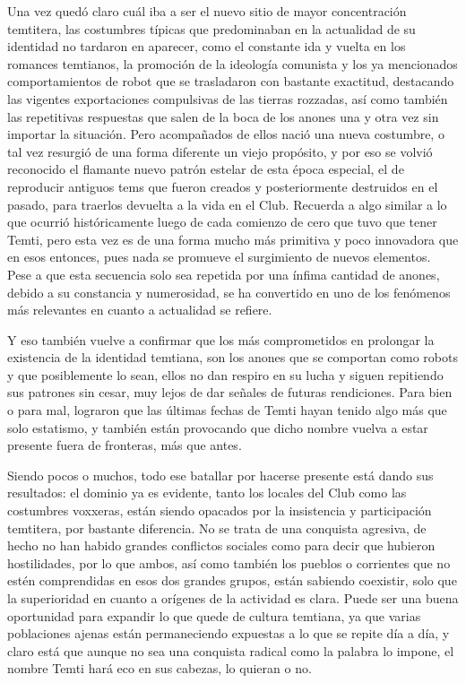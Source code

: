 \documentclass[
  spanish,
]{book}
\begin{document}
Una vez quedó claro cuál iba a ser el nuevo sitio de mayor concentración temtitera, las costumbres típicas que predominaban en la actualidad de su identidad no tardaron en aparecer, como el constante ida y vuelta en los romances temtianos, la promoción de la ideología comunista y los ya mencionados comportamientos de robot que se trasladaron con bastante exactitud, destacando las vigentes exportaciones compulsivas de las tierras rozzadas, así como también las repetitivas respuestas que salen de la boca de los anones una y otra vez sin importar la situación. Pero acompañados de ellos nació una nueva costumbre, o tal vez resurgió de una forma diferente un viejo propósito, y por eso se volvió reconocido el flamante nuevo patrón estelar de esta época especial, el de reproducir antiguos tems que fueron creados y posteriormente destruidos en el pasado, para traerlos devuelta a la vida en el Club. Recuerda a algo similar a lo que ocurrió históricamente luego de cada comienzo de cero que tuvo que tener Temti, pero esta vez es de una forma mucho más primitiva y poco innovadora que en esos entonces, pues nada se promueve el surgimiento de nuevos elementos. Pese a que esta secuencia solo sea repetida por una ínfima cantidad de anones, debido a su constancia y numerosidad, se ha convertido en uno de los fenómenos más relevantes en cuanto a actualidad se refiere.

Y eso también vuelve a confirmar que los más comprometidos en prolongar la existencia de la identidad temtiana, son los anones que se comportan como robots y que posiblemente lo sean, ellos no dan respiro en su lucha y siguen repitiendo sus patrones sin cesar, muy lejos de dar señales de futuras rendiciones. Para bien o para mal, lograron que las últimas fechas de Temti hayan tenido algo más que solo estatismo, y también están provocando que dicho nombre vuelva a estar presente fuera de fronteras, más que antes.

Siendo pocos o muchos, todo ese batallar por hacerse presente está dando sus resultados: el dominio ya es evidente, tanto los locales del Club como las costumbres voxxeras, están siendo opacados por la insistencia y participación temtitera, por bastante diferencia.
No se trata de una conquista agresiva, de hecho no han habido grandes conflictos sociales como para decir que hubieron hostilidades, por lo que ambos, así como también los pueblos o corrientes que no estén comprendidas en esos dos grandes grupos, están sabiendo coexistir, solo que la superioridad en cuanto a orígenes de la actividad es clara.
Puede ser una buena oportunidad para expandir lo que quede de cultura temtiana, ya que varias poblaciones ajenas están permaneciendo expuestas a lo que se repite día a día, y claro está que aunque no sea una conquista radical como la palabra lo impone, el nombre Temti hará eco en sus cabezas, lo quieran o no.
\end{document}
